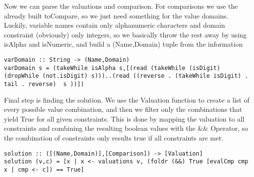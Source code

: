 \documentclass[a4paper,11pt]{article}
\begin{document}
 Now we can parse the valuations and comparison. For comparisons we use the already built toCompare, so we just need something for the value domains. Luckily, variable names contain only alphanumeric characters and domain constraint (obviously) only integers, so we basically throw the rest away by using isAlpha and isNumeric, and build a (Name,Domain) tuple from the information
 
\begin{lstlisting}
varDomain :: String -> (Name,Domain)
varDomain s = (takeWhile isAlpha s,[(read (takeWhile (isDigit) (dropWhile (not.isDigit) s)))..(read ((reverse . (takeWhile isDigit) . tail . reverse)  s ))])
\end{lstlisting}
 
 Final step is finding the solution. We use the Valuation function to create a list of every possible value combination, and then we filter only the combinations that yield True for all given constraints. This is done by mapping the valuation to all constraints and combining the resulting boolean values with the \&\& Operator, so the combination of constraints only results true if all constraints are met.

\begin{lstlisting}
solution :: ([(Name,Domain)],[Comparison]) -> [Valuation]
solution (v,c) = [x | x <- valuations v, (foldr (&&) True [evalCmp cmp x | cmp <- c]) == True]
\end{lstlisting}
\end{document}
